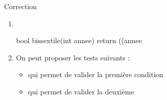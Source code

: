 \documentclass[10pt]{beamer}
\begin{document}
\begin{frame}[fragile]{\Ctitle}{\stitle}
\begin{exampleblock}{Correction}
	\begin{enumerate}
	\item<1-> \ \\
	\begin{langageC}
bool bissextile(int annee) {
	return ((annee%
}
	\end{langageC}
	\item<2-> On peut proposer les tests suivants :
	\begin{itemize}
		\item<3->  qui permet de valider la première condition
		\item<4->  qui permet de valider la deuxième
	\end{itemize}
\end{enumerate}
\end{exampleblock}
\end{frame}
\end{document}
